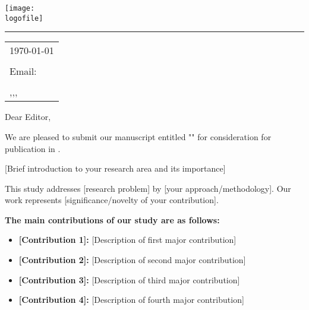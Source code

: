 \documentclass{article}
\newcommand{\logofile}{figures/logo.jpg}
\newcommand{\logowidth}{0.35\textwidth}
\begin{document}
\texttt{[image: \\logofile]}
\vspace{-1em}

\rule{\linewidth}{1pt} %

\bigskip\bigskip %

\hfill
\begin{tabular}{l}
	\hfill \today \bigskip          \\
	\hfill \correspondingAuthorName \\
	\hfill Email: \contactEmail     \\
	\hfill \addressLine             \\
	\hfill \cinstitutionCity,\cinstitutionState,\cinstitutionPostcode,\cinstitutionCountry
\end{tabular}

\bigskip %


Dear Editor,

\bigskip %


We are pleased to submit our manuscript entitled "\myTitle" for consideration for publication in \journalName.

[Brief introduction to your research area and its importance]

This study addresses [research problem] by [your approach/methodology]. Our work represents [significance/novelty of your contribution].

\bigskip

\textbf{The main contributions of our study are as follows:}
\begin{itemize}
	\item \textbf{[Contribution 1]:} [Description of first major contribution]

	\item \textbf{[Contribution 2]:} [Description of second major contribution]

	\item \textbf{[Contribution 3]:} [Description of third major contribution]

	\item \textbf{[Contribution 4]:} [Description of fourth major contribution]

\end{itemize}
\end{document}
